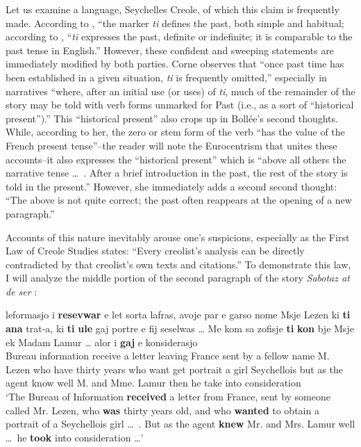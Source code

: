 Let us examine a language, Seychelles Creole, of which this claim is frequently made. According to \citet[102]{Corne1977}, ``the marker \textit{ti} defines the past, both simple and habitual{\textquotedbl}; according to \citet[55]{Bollee1977}, ``\textit{ti} expresses the past, definite or indefinite; it is comparable to the past tense in English.'' However, these confident and sweeping statements are immediately modified by both parties. Corne observes that ``once past time has been established in a given situation, \textit{ti} is frequently omitted,'' especially in narratives ``where, after an initial use (or uses) of \textit{ti}, much of the remainder of the story may be told with verb forms unmarked for Past (i.e., as a sort of ``historical present'').'' This ``historical present'' also crops up in Bollée's second thoughts. While, according to her, the zero or stem form of the verb ``has the value of the French present tense''--the reader will note the Euro\-centrism that unites these accounts--it also expresses the ``historical present'' which is ``above all others the narrative tense \ldots~. After a brief introduction in the past, the rest of the story is told in the pres\-ent.'' However, she immediately adds a second second thought: ``The above is not quite correct; the past often reappears at the opening of a new paragraph.''

Accounts of this nature inevitably arouse one's suspicions, especially as the First Law of Creole Studies states: ``Every creolist's analysis can be directly contradicted by that creolist's own texts and citations.'' To demonstrate this law, I will analyze the middle portion of the second paragraph of the story \textit{Sabotaz at de ser} \citep[166]{Bollee1977}:

\ea\label{ex:2:94}
 {leformasjo} {i} \textbf{resevwar} {e} {let} {sorta} {lafras,} {avoje} {par} {e} {garso} {nome} {M}{sje} {Lezen} {ki} \textbf{ti} \textbf{ana} {trat-a,} {ki} \textbf{ti} \textbf{ule} {gaj} {portre} {e} {fij} {seselwas} {\ldots } {Me} {kom} {sa} {zofisje} \textbf{ti} \textbf{kon} {b}{je} {Msje} {ek} {M}{adam} {Lamur} {\ldots} {alor} i \textbf{gaj} {e} {konsiderasjo} \\
Bureau information {\PM} receive a letter leaving France sent by a fellow name M. Lezen who {\TNS} have {thirty years} who {\TNS} want get portrait a girl Seychellois { } but as the agent {\TNS} know well M. and Mme. Lamur { } then he take into consideration\\
\glt `The Bureau of Information \textbf{received} a letter from France, sent by someone called Mr. Lezen, who \textbf{was} thirty years old, and who \textbf{wanted} to obtain a portrait of a Seychellois girl \ldots~. But as the agent \textbf{knew} Mr. and Mrs. Lamur well \ldots~he \textbf{took} into consideration \ldots '
\z


